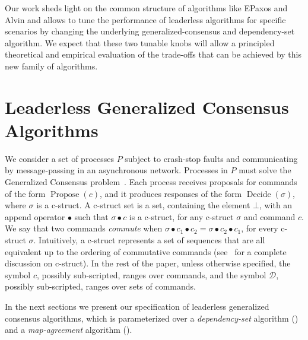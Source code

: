 Our work sheds light on the common structure of algorithms like EPaxos and Alvin and allows to tune the performance of leaderless algorithms for specific scenarios by changing the underlying generalized-consensus and dependency-set algorithm. 
We expect that these two tunable knobs will allow a principled theoretical and empirical evaluation of the trade-offs that can be achieved by this new family of algorithms.

\section{Leaderless Generalized Consensus Algorithms}



We consider a set of processes $P$ subject to crash-stop faults and communicating by message-passing in an asynchronous network. Processes in $P$ must solve the Generalized Consensus problem~\cite{Lamport05GeneralizeConsensus}. Each process receives proposals for commands of the form $\operatorname{Propose}(c)$, and it produces responses of the form $\operatorname{Decide}(\sigma)$, where $\sigma$ is a c-struct. A c-struct set is a set, containing the element $\bot$, with an append operator
$\bullet$ such that $\sigma \bullet c$ is a c-struct, for any c-struct $\sigma$ and command $c$. We say that two commands \textit{commute} when $\sigma\bullet c_1\bullet c_2 =  \sigma\bullet c_2\bullet c_1 $, for every c-struct $\sigma$. Intuitively, a c-struct represents a set of sequences that are all equivalent up to the ordering of commutative commands (see~\cite{Lamport05GeneralizeConsensus} for a complete discussion on c-struct). In the rest of the paper, unless otherwise specified, the symbol $c$, possibly sub-scripted, ranges over commands, and the symbol $\mathcal{D}$, possibly sub-scripted, ranges over sets of commands.

In the next sections we present our specification of leaderless generalized consensus algorithms, which is parameterized over a \textit{dependency-set} algorithm () and a \textit{map-agreement} algorithm (). 

